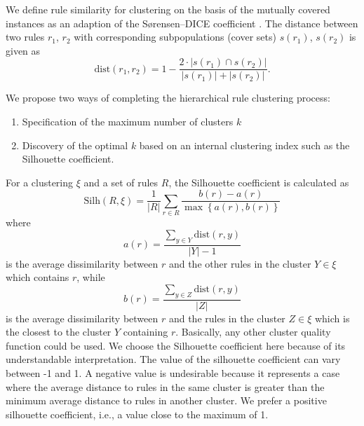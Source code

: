\documentclass[
  oneside]{book}
\providecommand{\tightlist}{%
  \setlength{\itemsep}{0pt}\setlength{\parskip}{0pt}}
\begin{document}
We define rule similarity for clustering on the basis of the mutually covered instances as an adaption of the Sørensen--DICE coefficient \autocite{Dice45}.
The distance between two rules \(r_1\), \(r_2\) with corresponding subpopulations (cover sets) \(s(r_1)\), \(s(r_2)\) is given as
\begin{equation}
\text{dist}(r_1,r_2) = 1 - \frac{2\cdot\left|s(r_1)\cap s(r_2)\right|}{\left|s(r_1)\right| + \left|s(r_2)\right|}.
\label{eq:dice}
\end{equation}

We propose two ways of completing the hierarchical rule clustering process:

\begin{enumerate}
\def\labelenumi{\arabic{enumi}.}
\tightlist
\item
  Specification of the maximum number of clusters \(k\)
\item
  Discovery of the optimal \(k\) based on an internal clustering index such as the Silhouette coefficient.
\end{enumerate}

For a clustering \(\xi\) and a set of rules \(R\), the Silhouette coefficient is calculated as
\begin{equation}
\text{Silh}(R,\xi) = \frac{1}{|R|}\sum_{r\in R}{\frac{b(r)-a(r)}{\max\left\{a(r), b(r)\right\}}}
\label{eq:silh}
\end{equation}
where
\begin{equation}
a(r)=\frac{\sum_{y\in{}Y}\text{dist}(r,y)}{|Y|-1}
\label{eq:silh-a}
\end{equation}
is the average dissimilarity between \(r\) and the other rules in the cluster \(Y\in\xi\) which contains \(r\), while
\begin{equation}
b(r)=\frac{\sum_{y\in{}Z}\text{dist}(r,y)}{|Z|}
\label{eq:silh-b}
\end{equation}
is the average dissimilarity between \(r\) and the rules in the cluster \(Z\in\xi\) which is the closest to the cluster \(Y\) containing \(r\).
Basically, any other cluster quality function could be used.
We choose the Silhouette coefficient here because of its understandable interpretation.
The value of the silhouette coefficient can vary between -1 and 1.
A negative value is undesirable because it represents a case where the average distance to rules in the same cluster is greater than the minimum average distance to rules in another cluster.
We prefer a positive silhouette coefficient, i.e., a value close to the maximum of 1.
\end{document}
